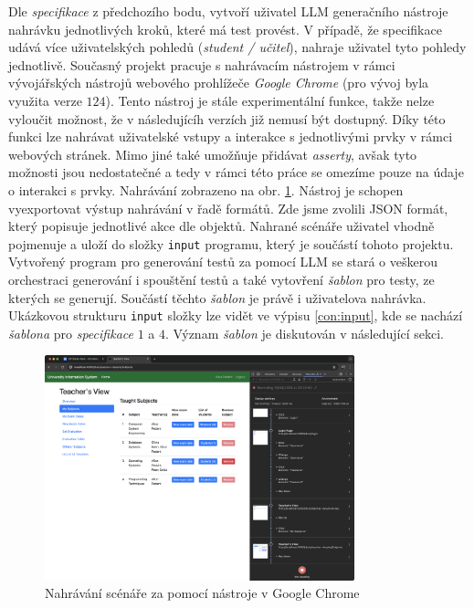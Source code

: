 \documentclass[czech, ma, kiv, he, iso690alph, pdf, viewonly]{fasthesis}
\begin{document}
    Dle \emph{specifikace} z předchozího bodu, vytvoří uživatel LLM generačního nástroje nahrávku jednotlivých kroků, které má test provést. V případě, že specifikace udává více uživatelských pohledů (\textit{student / učitel}), nahraje uživatel tyto pohledy jednotlivě. Současný projekt pracuje s nahrávacím nástrojem v rámci vývojářských nástrojů webového prohlížeče \textit{Google Chrome} (pro vývoj byla využita verze \(124\)). Tento nástroj je stále experimentální funkce, takže nelze vyloučit možnost, že v následujícíh verzích již nemusí být dostupný. Díky této funkci lze nahrávat uživatelské vstupy a interakce s jednotlivými prvky v rámci webových stránek. Mimo jiné také umožňuje přidávat \textit{asserty}, avšak tyto možnosti jsou nedostatečné a tedy v rámci této práce se omezíme pouze na údaje o interakci s prvky. Nahrávání zobrazeno na obr. \ref{fig:chrome_recording}. Nástroj je schopen vyexportovat výstup nahrávání v řadě formátů. Zde jsme zvolili JSON formát, který popisuje jednotlivé akce dle objektů. Nahrané scénáře uživatel vhodně pojmenuje a uloží do složky \verb|input| programu, který je součástí tohoto projektu. Vytvořený program pro generování testů za pomocí LLM se stará o veškerou orchestraci generování i spouštění testů a také vytovření \emph{šablon} pro testy, ze kterých se generují. Součástí těchto \emph{šablon} je právě i uživatelova nahrávka. Ukázkovou strukturu \verb|input| složky lze vidět ve výpisu \ref{con:input}, kde se nachází \emph{šablona} pro \textit{specifikace} \(1\) a \(4\). Význam \emph{šablon} je diskutován v následující sekci.

    \begin{figure}
        \includegraphics[width=0.8\textwidth]{pic/recording.png}
        \centering
        \caption{Nahrávání scénáře za pomocí nástroje v Google Chrome}
        \label{fig:chrome_recording}
    \end{figure}
\end{document}
